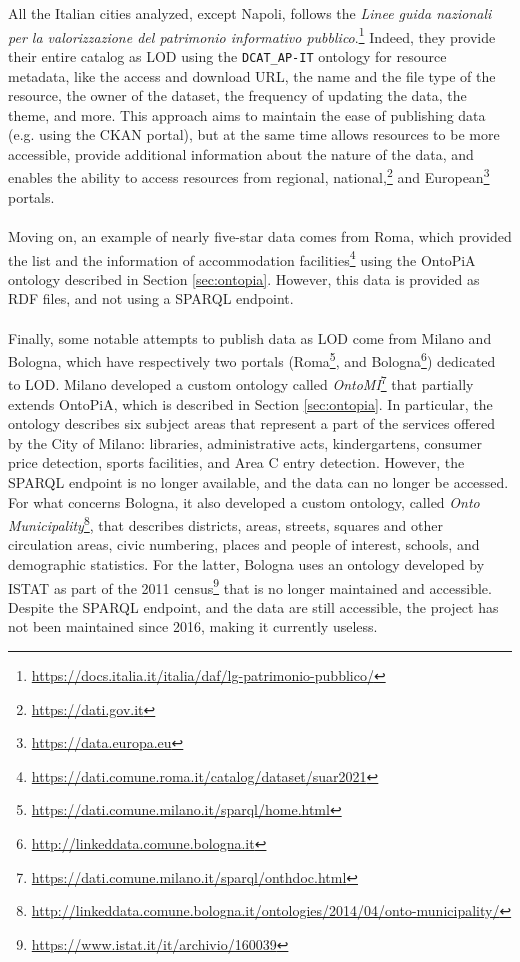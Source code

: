 All the Italian cities analyzed, except Napoli, follows the \textit{Linee guida nazionali per la valorizzazione del patrimonio informativo pubblico}.\footnote{\url{https://docs.italia.it/italia/daf/lg-patrimonio-pubblico/}} Indeed, they provide their entire catalog as \acl{LOD} using the \verb#DCAT_AP-IT# ontology for resource metadata, like the access and download \acs{URL}, the name and the file type of the resource, the owner of the dataset, the frequency of updating the data, the theme, and more. This approach aims to maintain the ease of publishing data (e.g. using the CKAN portal), but at the same time allows resources to be more accessible, provide additional information about the nature of the data, and enables the ability to access resources from regional, national,\footnote{\url{https://dati.gov.it}} and European\footnote{\url{https://data.europa.eu}} portals.

\paragraph*{}
Moving on, an example of nearly five-star data comes from Roma, which provided the list and the information of accommodation facilities\footnote{\url{https://dati.comune.roma.it/catalog/dataset/suar2021}} using the OntoPiA ontology described in Section \ref{sec:ontopia}. However, this data is provided as \ac{RDF} files, and not using a \ac{SPARQL} endpoint.

\paragraph*{}
Finally, some notable attempts to publish data as \acl{LOD} come from Milano and Bologna, which have respectively two portals (Roma\footnote{\url{https://dati.comune.milano.it/sparql/home.html}}, and Bologna\footnote{\url{http://linkeddata.comune.bologna.it}}) dedicated to \acl{LOD}. Milano developed a custom ontology called \textit{OntoMI}\footnote{\url{https://dati.comune.milano.it/sparql/onthdoc.html}} that partially extends OntoPiA, which is described in Section \ref{sec:ontopia}. In particular, the ontology describes six subject areas that represent a part of the services offered by the City of Milano: libraries, administrative acts, kindergartens, consumer price detection, sports facilities, and Area C entry detection. However, the \ac{SPARQL} endpoint is no longer available, and the data can no longer be accessed. For what concerns Bologna, it also developed a custom ontology, called \textit{Onto Municipality}\footnote{\url{http://linkeddata.comune.bologna.it/ontologies/2014/04/onto-municipality/}}, that describes districts, areas, streets, squares and other circulation areas, civic numbering, places and people of interest, schools, and demographic statistics. For the latter, Bologna uses an ontology developed by ISTAT as part of the 2011 census\footnote{\url{https://www.istat.it/it/archivio/160039}} that is no longer maintained and accessible. Despite the \ac{SPARQL} endpoint, and the data are still accessible, the project has not been maintained since 2016, making it currently useless.